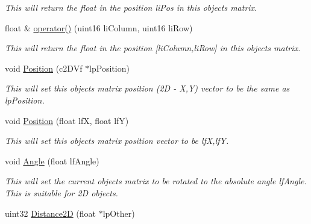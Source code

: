 \begin{DoxyCompactItemize}
\begin{DoxyCompactList}\small\item\em This will return the float in the position liPos in this objects matrix. \end{DoxyCompactList}\item 
\hypertarget{classc_camera_matrix4_a47de224c654b31aa8c22e55ec1d58ed0}{
float \& \hyperlink{classc_camera_matrix4_a47de224c654b31aa8c22e55ec1d58ed0}{operator()} (uint16 liColumn, uint16 liRow)}
\label{classc_camera_matrix4_a47de224c654b31aa8c22e55ec1d58ed0}

\begin{DoxyCompactList}\small\item\em This will return the float in the position \mbox{[}liColumn,liRow\mbox{]} in this objects matrix. \end{DoxyCompactList}\item 
\hypertarget{classc_camera_matrix4_a62fa2879539cc733e661d02b8a898578}{
void \hyperlink{classc_camera_matrix4_a62fa2879539cc733e661d02b8a898578}{Position} (c2DVf $\ast$lpPosition)}
\label{classc_camera_matrix4_a62fa2879539cc733e661d02b8a898578}

\begin{DoxyCompactList}\small\item\em This will set this objects matrix position (2D -\/ X,Y) vector to be the same as lpPosition. \end{DoxyCompactList}\item 
\hypertarget{classc_camera_matrix4_a293ac7d2919eae7205b568ea56fa104c}{
void \hyperlink{classc_camera_matrix4_a293ac7d2919eae7205b568ea56fa104c}{Position} (float lfX, float lfY)}
\label{classc_camera_matrix4_a293ac7d2919eae7205b568ea56fa104c}

\begin{DoxyCompactList}\small\item\em This will set this objects matrix position vector to be lfX,lfY. \end{DoxyCompactList}\item 
\hypertarget{classc_camera_matrix4_a6be0f1f82cc4ee5a5953cb3b569b4285}{
void \hyperlink{classc_camera_matrix4_a6be0f1f82cc4ee5a5953cb3b569b4285}{Angle} (float lfAngle)}
\label{classc_camera_matrix4_a6be0f1f82cc4ee5a5953cb3b569b4285}

\begin{DoxyCompactList}\small\item\em This will set the current objects matrix to be rotated to the absolute angle lfAngle. This is suitable for 2D objects. \end{DoxyCompactList}\item 
\hypertarget{classc_camera_matrix4_a02c68197ed3c64c95985269f5b9f66a4}{
uint32 \hyperlink{classc_camera_matrix4_a02c68197ed3c64c95985269f5b9f66a4}{Distance2D} (float $\ast$lpOther)}
\label{classc_camera_matrix4_a02c68197ed3c64c95985269f5b9f66a4}


\end{DoxyCompactItemize}
